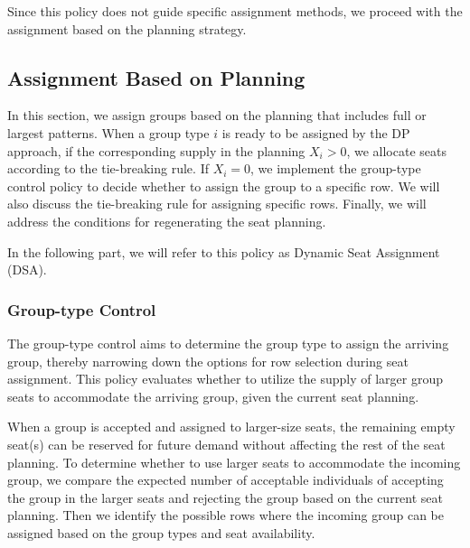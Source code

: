 Since this policy does not guide specific assignment methods, we proceed with the assignment based on the planning strategy.

\subsection{Assignment Based on Planning}
In this section, we assign groups based on the planning that includes full or largest patterns. When a group type $i$ is ready to be assigned by the DP approach, if the corresponding supply in the planning $X_{i} > 0$, we allocate seats according to the tie-breaking rule. If $X_{i} = 0$, we implement the group-type control policy to decide whether to assign the group to a specific row. We will also discuss the tie-breaking rule for assigning specific rows. Finally, we will address the conditions for regenerating the seat planning.

In the following part, we will refer to this policy as Dynamic Seat Assignment (DSA).


\subsubsection{Group-type Control}\label{nested_policy}
The group-type control aims to determine the group type to assign the arriving group, thereby narrowing down the options for row selection during seat assignment. This policy evaluates whether to utilize the supply of larger group seats to accommodate the arriving group, given the current seat planning. 



When a group is accepted and assigned to larger-size seats, the remaining empty seat(s) can be reserved for future demand without affecting the rest of the seat planning. To determine whether to use larger seats to accommodate the incoming group, we compare the expected number of acceptable individuals of accepting the group in the larger seats and rejecting the group based on the current seat planning. Then we identify the possible rows where the incoming group can be assigned based on the group types and seat availability.

